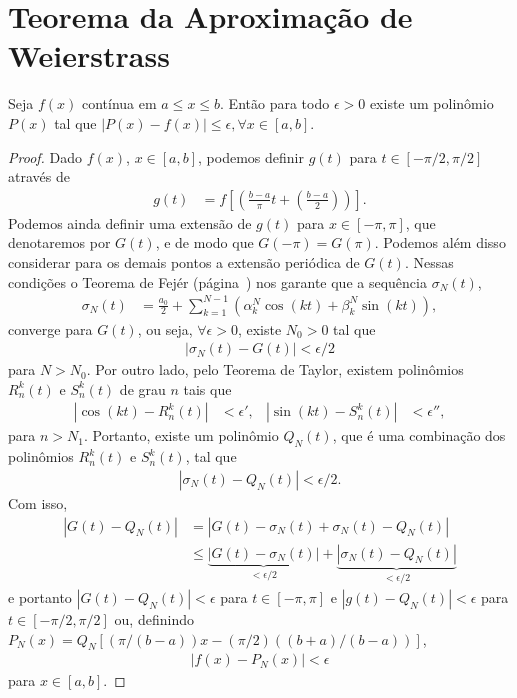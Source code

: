 \section{Teorema da Aproxima\c{c}\~{a}o de Weierstrass}
\begin{teo}
    Seja $f(x)$ cont\'{i}nua em $a \leq x \leq b$. Ent\~{a}o para todo $\epsilon > 0$ existe um polin\^{o}mio $P(x)$ tal que $|P(x) - f(x)| \leq \epsilon, \forall x \in [a,b]$.
\end{teo}
\begin{proof}
    Dado $f(x)$, $x \in [a,b]$, podemos definir $g(t)$ para $t \in [-\pi/2, \pi/2]$ atrav\'{e}s de
    \begin{align*}
        g(t) &= f\left[ \left( \frac{b - a}{\pi} t + \left( \frac{b - a}{2} \right) \right) \right].
    \end{align*}
    Podemos ainda definir uma extens\~{a}o de $g(t)$ para $x \in [-\pi, \pi]$, que denotaremos por $G(t)$, e de modo que $G(-\pi) = G(\pi)$. Podemos al\'{e}m disso considerar para os demais pontos a extens\~{a}o peri\'{o}dica de $G(t)$. Nessas condi\c{c}\~{o}es o Teorema de Fej\'{e}r (p\'{a}gina~\pageref{teo:fejer}) nos garante que a sequ\^{e}ncia $\sigma_N(t)$,
    \begin{align*}
        \sigma_N(t) &= \frac{a_0}{2} + \sum_{k = 1}^{N - 1} \left( \alpha_k^N \cos\left( k t \right) + \beta_k^N \sin\left( k t \right) \right),
    \end{align*}
    converge para $G(t)$, ou seja, $\forall \epsilon > 0$, existe $N_0 > 0$ tal que
    \begin{align*}
        | \sigma_N(t) - G(t) | < \epsilon/2
    \end{align*}
    para $N > N_0$. Por outro lado, pelo Teorema de Taylor, existem polin\^{o}mios $R_n^k(t)$ e $S_n^k(t)$ de grau $n$ tais que
    \begin{align*}
        | \cos\left( k t \right) - R_n^k(t) | &< \epsilon', & | \sin\left( k t \right) - S_n^k(t) | &< \epsilon'',
    \end{align*}
    para $n > N_1$. Portanto, existe um polin\^{o}mio $Q_N(t)$, que \'{e} uma combina\c{c}\~{a}o dos polin\^{o}mios $R_n^k(t)$ e $S_n^k(t)$, tal que
    \begin{align*}
        | \sigma_N(t) - Q_N(t) | < \epsilon/2.
    \end{align*}
    Com isso,
    \begin{align*}
        | G(t) - Q_N(t) | &= | G(t) - \sigma_N(t) + \sigma_N(t) - Q_N(t) | \\
        &\leq \underbrace{| G(t) - \sigma_N(t) |}_{< \epsilon/2} + \underbrace{| \sigma_N(t) - Q_N(t) |}_{< \epsilon/2}
    \end{align*}
    e portanto $| G(t) - Q_N(t) | < \epsilon$ para $t \in [-\pi, \pi]$ e $| g(t) - Q_N(t) | < \epsilon$ para $t \in [-\pi/2, \pi/2]$ ou, definindo $P_N(x) = Q_N\left[ \left( \pi / \left( b - a \right) \right) x - \left( \pi / 2 \right) \left( \left( b + a \right) / \left( b - a \right) \right) \right]$,
    \begin{align*}
        | f(x) - P_N(x) | < \epsilon
    \end{align*}
    para $x \in [a, b]$.
\end{proof}
